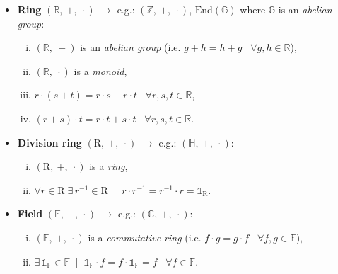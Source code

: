 \documentclass[10pt,a4paper]{article}
\begin{document}
\begin{itemize}
        \item \textbf{Ring} $\left( \mathds{R},\ +,\ \cdot \right)$
            $\longrightarrow$ e.g.: $\left( \mathds{Z},\ +,\ \cdot \right)$,
            $\mathrm{End}\left( \mathds{G} \right)$ where $\mathds{G}$ is an
            \textit{abelian group}:
            \begin{enumerate}[i)]
                \item $\left( \mathds{R},\ + \right)$ is an \textit{abelian
                    group} (i.e. $g + h = h + g\;\;\; \forall g,h \in
                    \mathds{R}$),
                \item $\left( \mathds{R},\ \cdot \right)$ is a \textit{monoid},
                \item $r \cdot \left( s + t \right) = r \cdot s + r \cdot
                    t\;\;\; \forall r,s,t \in \mathds{R}$,
                \item $\left( r + s \right) \cdot t = r \cdot t + s \cdot
                    t\;\;\; \forall r,s,t \in \mathds{R}$.
            \end{enumerate}

        \item \textbf{Division ring} $\left( \mathrm{R},\ +,\ \cdot \right)$
            $\longrightarrow$ e.g.: $\left( \mathds{H},\ +,\ \cdot \right)$:
            \begin{enumerate}[i)]
                \item $\left( \mathrm{R},\ +,\ \cdot \right)$ is a \textit{ring},
                \item $\forall r \in \mathrm{R}\; \exists\, r^{-1} \in
                    \mathrm{R}\; \mid\; r \cdot r^{-1} = r^{-1} \cdot r =
                    \mathds{1}_{\mathrm{R}}$.
            \end{enumerate}

        \item \textbf{Field} $\left( \mathds{F},\ +,\ \cdot \right)$
            $\longrightarrow$ e.g.: $\left( \mathds{C},\ +,\ \cdot \right)$:
            \begin{enumerate}[i)]
                \item $\left( \mathds{F},\ +,\ \cdot \right)$ is a
                    \textit{commutative ring} (i.e. $f \cdot g = g \cdot
                    f\;\;\; \forall f,g \in \mathds{F}$),
                \item $\exists\, \mathds{1}_{\mathds{F}} \in \mathds{F}\;
                    \mid\; \mathds{1}_{\mathds{F}} \cdot f = f \cdot
                    \mathds{1}_{\mathds{F}} = f\;\;\; \forall f \in \mathds{F}$.
            \end{enumerate}


\end{itemize}
\end{document}
